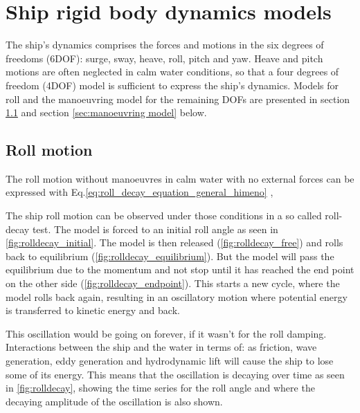 \chapter{Ship rigid body dynamics models}
\label{ch:models}

The ship's dynamics comprises the forces and motions in the six degrees of freedoms (6DOF): surge, sway, heave, roll, pitch and yaw. Heave and pitch motions are often neglected in calm water conditions, so that a four degrees of freedom (4DOF) model is sufficient to express the ship's dynamics. Models for roll and the manoeuvring model for the remaining DOFs are presented in section \ref{sec:roll} and section \ref{sec:manoeuvring model} below. 

\section{Roll motion} \label{sec:roll}
The roll motion without manoeuvres in calm water with no external forces can be expressed with Eq.\ref{eq:roll_decay_equation_general_himeno} \cite{himeno_prediction_1981},

\noindent The ship roll motion can be observed under those conditions in a so called roll-decay test. The model is forced to an initial roll angle as seen in \autoref{fig:rolldecay_initial}. The model is then released (\autoref{fig:rolldecay_free}) and rolls back to equilibrium (\autoref{fig:rolldecay_equilibrium}). But the model will pass the equilibrium due to the momentum and not stop until it has reached the end point on the other side (\autoref{fig:rolldecay_endpoint}). This starts a new cycle, where the model rolls back again, resulting in an oscillatory motion where potential energy is transferred to kinetic energy and back.

\noindent This oscillation would be going on forever, if it wasn't for the roll damping. Interactions between the ship and the water in terms of: as friction, wave generation, eddy generation and hydrodynamic lift will cause the ship to lose some of its energy. This means that the oscillation is decaying over time as seen in \autoref{fig:rolldecay}, showing the time series for the roll angle and where the decaying amplitude of the oscillation is also shown.

